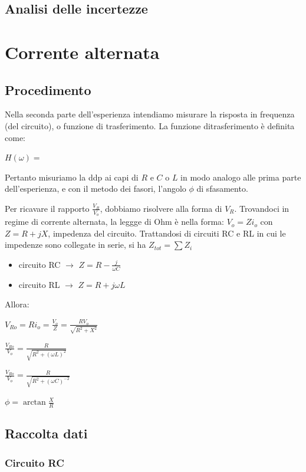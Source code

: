 \subsection{Analisi delle incertezze}


\section{Corrente alternata}
\subsection{Procedimento}
Nella seconda parte dell'esperienza intendiamo misurare la risposta in frequenza (del circuito), o funzione di trasferimento. La funzione ditrasferimento è definita come:

$H\left(\omega \right) = $  


Pertanto misuriamo la ddp ai capi di $R$ e $C$ o $L$ in modo analogo alle prima parte dell'esperienza, e con il metodo dei fasori, l'angolo $\phi$ di sfasamento.

Per ricavare il rapporto $\frac{V_{R}}{V_{o}}$, dobbiamo risolvere alla forma di $V_R$. Trovandoci in regime di corrente alternata, la leggge di Ohm è nella forma: $ V_o = Zi_o$ con $Z = R + jX$, impedenza del circuito.
Trattandosi di circuiti RC e RL in cui le impedenze sono collegate in serie, si ha $Z_{tot} = \sum Z_i$

\begin{itemize}
\item circuito RC $\rightarrow$ $Z=R-\frac{j}{\omega C}$
\item circuito RL $\rightarrow$ $Z=R+j\omega L$
\end{itemize}  

Allora: 


$V_{Ro} = Ri_o = \frac{V_o}{Z} = \frac{RV_o}{\sqrt{R^2+X^2}} $ 

$\frac{V_{Ro}}{V_o} = \frac{R}{\sqrt{R^2+(\omega L)^2}}$

$\frac{V_{Ro}}{V_o} = \frac{R}{\sqrt{R^2+(\omega C)^{-2}}}$

$\phi = \arctan \frac{X}{R} $ 

\subsection{Raccolta dati}

\subsubsection{Circuito RC}

